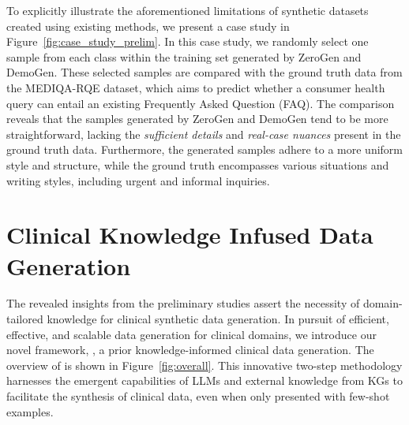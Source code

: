 To explicitly illustrate the aforementioned limitations of synthetic datasets created using existing methods, we present a case study in Figure~\ref{fig:case_study_prelim}. In this case study, we randomly select one sample from each class within the training set generated by ZeroGen and DemoGen. These selected samples are compared with the ground truth data from the MEDIQA-RQE dataset, which aims to predict whether a consumer health query can entail an existing Frequently Asked Question (FAQ). The comparison reveals that the samples generated by ZeroGen and DemoGen tend to be more straightforward, lacking the \textit{sufficient details} and \textit{real-case nuances} present in the ground truth data. 
Furthermore, the generated samples adhere to a more uniform style and structure, while the ground truth encompasses various situations and writing styles, including urgent and informal inquiries.


\section{Clinical Knowledge Infused Data Generation}
The revealed insights from the preliminary studies assert the necessity of domain-tailored knowledge for clinical synthetic data generation. In pursuit of efficient, effective, and scalable data generation for clinical domains, we introduce our novel framework, {\ours}, a prior knowledge-informed clinical data generation. The overview of {\ours} is shown in Figure~\ref{fig:overall}. This innovative two-step methodology harnesses the emergent capabilities of LLMs and external knowledge from KGs to facilitate the synthesis of clinical data, even when only presented with few-shot examples. 



